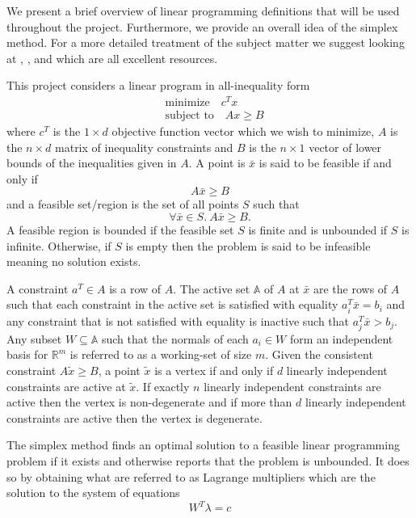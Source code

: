 \documentclass{standalone}
\begin{document}
We present a brief overview of linear programming definitions that will be used throughout the project. Furthermore, we provide an overall idea of the simplex method. For a more detailed treatment of the subject matter we suggest looking at \cite{nocedal2006numerical}, \cite{chvatal1983linear}, \cite{christos1982combinatorial} and \cite{dantzig2016linear} which are all excellent resources.\par
This project considers a linear program in all-inequality form
\begin{align}
  &\text{minimize}\quad c^{T}x \nonumber\\
  &\text{subject to}\quad Ax \ge B \nonumber
\end{align}
where $c^{T}$ is the $1\times d$ objective function vector which we wish to minimize, $A$ is the $n\times d$ matrix of inequality constraints and $B$ is the $n\times 1$ vector of lower bounds of the inequalities given in $A$. A point is $\bar{x}$ is said to be feasible if and only if
\[
  A\bar{x}\ge B
\]
and a feasible set/region is the set of all points $S$ such that
\[
  \forall \bar{x}\in S.\:A\bar{x}\ge B.
\]
A feasible region is bounded if the feasible set $S$ is finite and is unbounded if $S$ is infinite. Otherwise, if $S$ is empty then the problem is said to be infeasible meaning no solution exists.\par
A constraint $a^{T}\in A$ is a row of $A$. The active set $\mathbb{A}$ of $A$ at $\bar{x}$ are the rows of $A$ such that each constraint in the active set is satisfied with equality $a_{i}^{T}\bar{x}=b_{i}$ and any constraint that is not satisfied with equality is inactive such that $a_{j}^{T}\bar{x}>b_{j}$. Any subset $W\subseteq\mathbb{A}$ such that the normals of each $a_{i}\in W$ form an independent basis for $\mathbb{R}^{m}$ is referred to as a working-set of size $m$. Given the consistent constraint $A\tilde{x}\ge B$, a point $\tilde{x}$ is a vertex if and only if $d$ linearly independent constraints are active at $\tilde{x}$. If exactly $n$ linearly independent constraints are active then the vertex is non-degenerate and if more than $d$ linearly independent constraints are active then the vertex is degenerate.\par
The simplex method finds an optimal solution to a feasible linear programming problem if it exists and otherwise reports that the problem is unbounded. It does so by obtaining what are referred to as Lagrange multipliers which are the solution to the system of equations
\[
  W^{T}\lambda=c
\]
\end{document}

